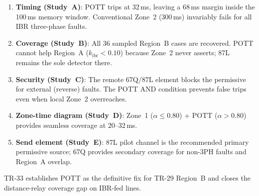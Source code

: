 \documentclass[11pt,a4paper]{article}
\begin{document}
\begin{enumerate}
  \item \textbf{Timing (Study~A)}: POTT trips at 32\,ms, leaving a 68\,ms margin
    inside the 100\,ms memory window.  Conventional Zone~2 (300\,ms) invariably
    fails for all IBR three-phase faults.

  \item \textbf{Coverage (Study~B)}: All 36 sampled Region~B cases are recovered.
    POTT cannot help Region~A ($k_\mathrm{ibr}<0.10$) because Zone~2 never asserts;
    87L remains the sole detector there.

  \item \textbf{Security (Study~C)}: The remote 67Q/87L element blocks the
    permissive for external (reverse) faults.  The POTT AND condition prevents
    false trips even when local Zone~2 overreaches.

  \item \textbf{Zone-time diagram (Study~D)}: Zone~1 ($\alpha\leq0.80$) +
    POTT ($\alpha>0.80$) provides seamless coverage at 20--32\,ms.

  \item \textbf{Send element (Study~E)}: 87L pilot channel is the recommended
    primary permissive source; 67Q provides secondary coverage for non-3PH faults
    and Region~A overlap.
\end{enumerate}

\noindent
TR-33 establishes POTT as the definitive fix for TR-29 Region~B and closes the
distance-relay coverage gap on IBR-fed lines.



\end{document}
